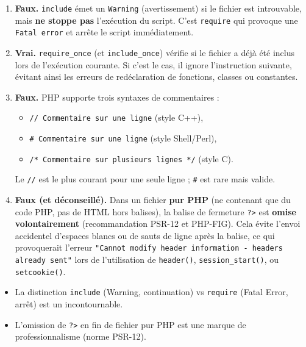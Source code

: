 \documentclass[11pt]{article}
\begin{document}
\begin{corrige}

\begin{enumerate}
    \item \textbf{Faux.} \texttt{include} émet un \texttt{Warning} (avertissement) si le fichier est introuvable, mais \textbf{ne stoppe pas} l'exécution du script. C'est \texttt{require} qui provoque une \texttt{Fatal error} et arrête le script immédiatement.
    \item \textbf{Vrai.} \texttt{require\_once} (et \texttt{include\_once}) vérifie si le fichier a déjà été inclus lors de l'exécution courante. Si c'est le cas, il ignore l'instruction suivante, évitant ainsi les erreurs de redéclaration de fonctions, classes ou constantes.
    \item \textbf{Faux.} PHP supporte trois syntaxes de commentaires :
    \begin{itemize}
        \item \texttt{// Commentaire sur une ligne} (style C++),
        \item \texttt{\# Commentaire sur une ligne} (style Shell/Perl),
        \item \texttt{/* Commentaire sur plusieurs lignes */} (style C).
    \end{itemize}
    Le \texttt{//} est le plus courant pour une seule ligne ; \texttt{\#} est rare mais valide.
    \item \textbf{Faux (et déconseillé).} Dans un fichier \textbf{pur PHP} (ne contenant que du code PHP, pas de HTML hors balises), la balise de fermeture \texttt{?>} est \textbf{omise volontairement} (recommandation PSR-12 et PHP-FIG). Cela évite l'envoi accidentel d'espaces blancs ou de sauts de ligne après la balise, ce qui provoquerait l'erreur \texttt{"Cannot modify header information - headers already sent"} lors de l'utilisation de \texttt{header()}, \texttt{session\_start()}, ou \texttt{setcookie()}.
\end{enumerate}

\begin{attention}
\begin{itemize}
    \item La distinction \texttt{include} (Warning, continuation) vs \texttt{require} (Fatal Error, arrêt) est un incontournable.
    \item L'omission de \texttt{?>} en fin de fichier pur PHP est une marque de professionnalisme (norme PSR-12).
\end{itemize}
\end{attention}
\end{corrige}
\end{document}
